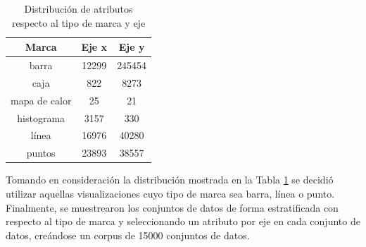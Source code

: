\begin{table}[H]
    \centering
    \begin{tabular}{ |c|c|c|}
        \hline
        \bf Marca & \bf Eje x & \bf Eje y\\
        \hline
        barra & 12299 & 245454 \\
        caja & 822 & 8273\\
        mapa de calor & 25  & 21\\
        histograma & 3157 & 330 \\
        l\'inea & 16976 & 40280  \\
        puntos & 23893 & 38557 \\
        \hline


    \end{tabular}
    \caption{Distribuci\'on de atributos respecto al tipo de marca y eje}
    \label{tab:corpus-dist}
\end{table}





Tomando en consideraci\'on la distribuci\'on mostrada en la Tabla \ref{tab:corpus-dist} se decidi\'o utilizar
aquellas visualizaciones cuyo tipo de marca sea barra, l\'inea o punto.
Finalmente, se muestrearon los conjuntos de datos de forma estratificada con respecto al tipo de marca y seleccionando un atributo
por eje en cada conjunto de datos,
cre\'andose un corpus de 15000 conjuntos de datos.


